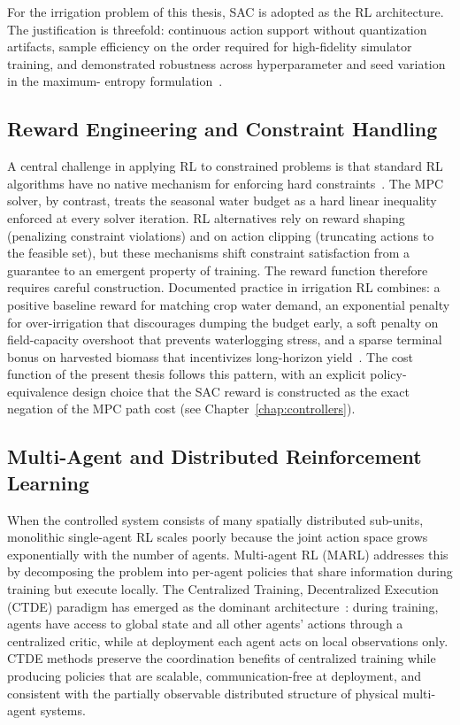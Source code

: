 For the irrigation problem of this thesis, SAC is adopted as the RL
architecture. The justification is threefold: continuous action
support without quantization artifacts, sample efficiency on the
order required for high-fidelity simulator training, and demonstrated
robustness across hyperparameter and seed variation in the maximum-
entropy formulation~\cite{haarnoja2019sac}.

\subsection{Reward Engineering and Constraint Handling}

A central challenge in applying RL to constrained problems is that
standard RL algorithms have no native mechanism for enforcing hard
constraints~\cite{Bayar2025}. The MPC solver, by contrast, treats the
seasonal water budget as a hard linear inequality enforced at every
solver iteration. RL alternatives rely on reward shaping (penalizing
constraint violations) and on action clipping (truncating actions to
the feasible set), but these mechanisms shift constraint satisfaction
from a guarantee to an emergent property of training. The reward
function therefore requires careful construction. Documented practice
in irrigation RL combines: a positive baseline reward for matching
crop water demand, an exponential penalty for over-irrigation that
discourages dumping the budget early, a soft penalty on field-capacity
overshoot that prevents waterlogging stress, and a sparse terminal
bonus on harvested biomass that incentivizes long-horizon
yield~\cite{Bayar2025}. The cost function of the present thesis
follows this pattern, with an explicit policy-equivalence design
choice that the SAC reward is constructed as the exact negation of
the MPC path cost (see Chapter~\ref{chap:controllers}).

\subsection{Multi-Agent and Distributed Reinforcement Learning}

When the controlled system consists of many spatially distributed
sub-units, monolithic single-agent RL scales poorly because the
joint action space grows exponentially with the number of agents.
Multi-agent RL (MARL) addresses this by decomposing the problem into
per-agent policies that share information during training but execute
locally. The Centralized Training, Decentralized Execution (CTDE)
paradigm has emerged as the dominant
architecture~\cite{amato2024ctde}: during training, agents have
access to global state and all other agents' actions through a
centralized critic, while at deployment each agent acts on local
observations only. CTDE methods preserve the coordination benefits
of centralized training while producing policies that are scalable,
communication-free at deployment, and consistent with the partially
observable distributed structure of physical multi-agent systems.

